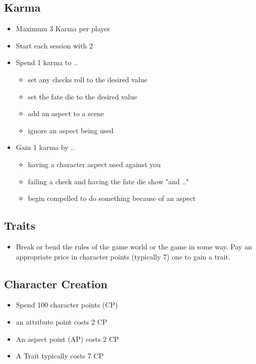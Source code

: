 \documentclass[11pt]{article}
\begin{document}
{\subsection{Karma}
\label{sec:org817069d}
\begin{itemize}
\item Maximum 3 Karma per player
\item Start each session with 2
\item Spend 1 karma to ..
\begin{itemize}
\item set any checks roll to the desired value
\item set the fate die to the desired value
\item add an aspect to a scene
\item ignore an aspect being used
\end{itemize}
\item Gain 1 karma by ..
\begin{itemize}
\item having a character aspect used against you
\item failing a check and having the fate die show "and .."
\item begin compelled to do something because of an aspect
\end{itemize}
\end{itemize}

\subsection{Traits}
\label{sec:orgeb3e1bf}
\begin{itemize}
\item Break or bend the rules of the game world or the game in some way. Pay an appropriate price in character points (typically 7) one to gain a trait.
\end{itemize}

\subsection{Character Creation}
\label{sec:org8ad2fd7}
\begin{itemize}
\item Spend 100 character points (CP)
\item an attribute point costs 2 CP
\item An aspect point (AP) costs 2 CP
\item A Trait typically costs 7 CP
\end{itemize}

}
\end{document}
